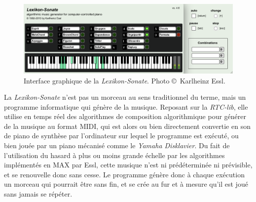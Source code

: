 \documentclass[a4paper,12pt]{article}
\begin{document}
\begin{figure}[!h]
\begin{center}
\includegraphics[width=\textwidth]{images/lexson.png}
\caption{\footnotesize Interface graphique de la \emph{Lexikon-Sonate}. Photo \copyright~Karlheinz Essl.}
\label{lsinterface}
\end{center}
\end{figure}

La \emph{Lexikon-Sonate} n'est pas un morceau au sens traditionnel du terme, mais un programme informatique qui génère de la musique. Reposant sur la \emph{RTC-lib}, elle utilise en temps réel des algorithmes de composition algorithmique pour générer de la musique au format MIDI, qui est alors ou bien directement convertie en son de piano de synthèse par l'ordinateur sur lequel le programme est exécuté, ou bien jouée par un piano mécanisé comme le \emph{Yamaha Disklavier}. Du fait de l'utilisation du hasard à plus ou moins grande échelle par les algorithmes implémentés en MAX par Essl, cette musique n'est ni prédéterminée ni prévisible, et se renouvelle donc sans cesse. Le programme génère donc à chaque exécution un morceau qui pourrait être sans fin, et se crée au fur et à mesure qu'il est joué sans jamais se répéter.
\end{document}
